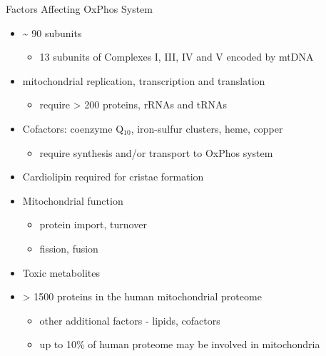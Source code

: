 \documentclass[presentation, smaller]{beamer}
\begin{document}
\begin{frame}[label={sec:orge143eb5}]{Factors Affecting OxPhos System}
\begin{itemize}
\item \textasciitilde{} 90 subunits
\begin{itemize}
\item 13 subunits of Complexes I, III, IV and V encoded by mtDNA
\end{itemize}
\item mitochondrial replication, transcription and translation
\begin{itemize}
\item require \textgreater{} 200 proteins, rRNAs and tRNAs
\end{itemize}
\item Cofactors: coenzyme Q\(_{\text{10}}\), iron-sulfur clusters, heme, copper
\begin{itemize}
\item require synthesis and/or transport to OxPhos system
\end{itemize}
\item Cardiolipin required for cristae formation
\item Mitochondrial function
\begin{itemize}
\item protein import, turnover
\item fission, fusion
\end{itemize}
\item Toxic metabolites

\item \textgreater{} 1500 proteins in the human mitochondrial proteome
\begin{itemize}
\item other additional factors - lipids, cofactors
\item up to 10\% of human proteome may be involved in mitochondria
\end{itemize}
\end{itemize}
\end{frame}
\end{document}
